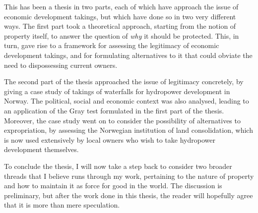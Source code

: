 This has been a thesis in two parts, each of which have approach the issue of economic development takings, but which have done so in two very different ways. The first part took a theoretical approach, starting from the notion of property itself, to answer the question of {\it why} it should be protected. This, in turn, gave rise to a framework for assessing the legitimacy of economic development takings, and for formulating alternatives to it that could obviate the need to dispossessing current owners.

The second part of the thesis approached the issue of legitimacy concretely, by giving a case study of takings of waterfalls for hydropower development in Norway. The political, social and economic context was also analysed, leading to an application of the Gray test formulated in the first part of the thesis. Moreover, the case study went on to consider the possibility of alternatives to expropriation, by assessing the Norwegian institution of land consolidation, which is now used extensively by local owners who wish to take hydropower development themselves.




To conclude the thesis, I will now take a step back to consider two broader threads that I believe runs through my work, pertaining to the nature of property and how to maintain it as force for good in the world. The discussion is preliminary, but after the work done in this thesis, the reader will hopefully agree that it is more than mere speculation.

